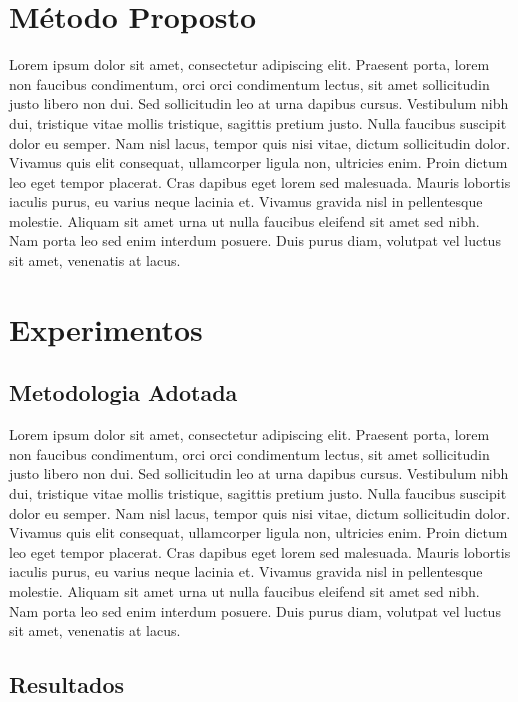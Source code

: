 \documentclass[12pt]{article}
\begin{document}
\section{Método Proposto}

Lorem ipsum dolor sit amet, consectetur adipiscing elit. Praesent porta, lorem non faucibus condimentum, orci orci condimentum lectus, sit amet sollicitudin justo libero non dui. Sed sollicitudin leo at urna dapibus cursus. Vestibulum nibh dui, tristique vitae mollis tristique, sagittis pretium justo. Nulla faucibus suscipit dolor eu semper. Nam nisl lacus, tempor quis nisi vitae, dictum sollicitudin dolor. Vivamus quis elit consequat, ullamcorper ligula non, ultricies enim. Proin dictum leo eget tempor placerat. Cras dapibus eget lorem sed malesuada. Mauris lobortis iaculis purus, eu varius neque lacinia et. Vivamus gravida nisl in pellentesque molestie. Aliquam sit amet urna ut nulla faucibus eleifend sit amet sed nibh. Nam porta leo sed enim interdum posuere. Duis purus diam, volutpat vel luctus sit amet, venenatis at lacus. 

\section{Experimentos}

\subsection{Metodologia Adotada}
Lorem ipsum dolor sit amet, consectetur adipiscing elit. Praesent porta, lorem non faucibus condimentum, orci orci condimentum lectus, sit amet sollicitudin justo libero non dui. Sed sollicitudin leo at urna dapibus cursus. Vestibulum nibh dui, tristique vitae mollis tristique, sagittis pretium justo. Nulla faucibus suscipit dolor eu semper. Nam nisl lacus, tempor quis nisi vitae, dictum sollicitudin dolor. Vivamus quis elit consequat, ullamcorper ligula non, ultricies enim. Proin dictum leo eget tempor placerat. Cras dapibus eget lorem sed malesuada. Mauris lobortis iaculis purus, eu varius neque lacinia et. Vivamus gravida nisl in pellentesque molestie. Aliquam sit amet urna ut nulla faucibus eleifend sit amet sed nibh. Nam porta leo sed enim interdum posuere. Duis purus diam, volutpat vel luctus sit amet, venenatis at lacus.

\subsection{Resultados}
\end{document}

